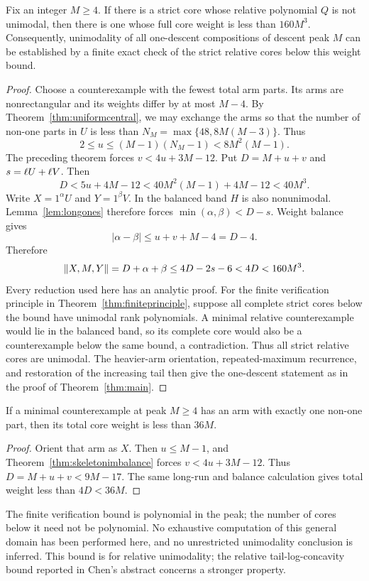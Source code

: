 \begin{theorem}\label{thm:cubicbound}
Fix an integer $M\ge4$. If there is a strict core whose relative polynomial $Q$ is not unimodal, then there is one whose full core weight is less than $160M^3$.
Consequently, unimodality of all one-descent compositions of descent peak $M$ can be established by a finite exact check of the strict relative cores below this weight bound.
\end{theorem}
\begin{proof}
Choose a counterexample with the fewest total arm parts. Its arms are nonrectangular and its weights differ by at most $M-4$. By Theorem~\ref{thm:uniformcentral}, we may exchange the arms so that the number of non-one parts in $U$ is less than $N_M=\max\{48,8M(M-3)\}$. Thus
\[
 2\le u\le(M-1)(N_M-1)<8M^2(M-1).
\]
The preceding theorem forces $v<4u+3M-12$. Put $D=M+u+v$ and $s=\ell U+\ell V$. Then
\[
 D<5u+4M-12<40M^2(M-1)+4M-12<40M^3.
\]
Write $X=1^\alpha U$ and $Y=1^\beta V$. In the balanced band $H$ is also nonunimodal. Lemma~\ref{lem:longones} therefore forces $\min(\alpha,\beta)<D-s$. Weight balance gives
\[
 |\alpha-\beta|\le u+v+M-4=D-4.
\]
Therefore
\[
 \lVert X,M,Y\rVert=D+\alpha+\beta
 \le4D-2s-6<4D<160M^3.
\]
Every reduction used here has an analytic proof. For the finite verification principle in Theorem~\ref{thm:finiteprinciple}, suppose all complete strict cores below the bound have unimodal rank polynomials. A minimal relative counterexample would lie in the balanced band, so its complete core would also be a counterexample below the same bound, a contradiction. Thus all strict relative cores are unimodal. The heavier-arm orientation, repeated-maximum recurrence, and restoration of the increasing tail then give the one-descent statement as in the proof of Theorem~\ref{thm:main}.
\end{proof}

\begin{corollary}\label{cor:linearshort}
If a minimal counterexample at peak $M\ge4$ has an arm with exactly one non-one part, then its total core weight is less than $36M$.
\end{corollary}
\begin{proof}
Orient that arm as $X$. Then $u\le M-1$, and Theorem~\ref{thm:skeletonimbalance} forces $v<4u+3M-12$. Thus $D=M+u+v<9M-17$. The same long-run and balance calculation gives total weight less than $4D<36M$.
\end{proof}

The finite verification bound is polynomial in the peak; the number of cores below it need not be polynomial. No exhaustive computation of this general domain has been performed here, and no unrestricted unimodality conclusion is inferred. This bound is for relative unimodality; the relative tail-log-concavity bound reported in Chen's abstract concerns a stronger property.

